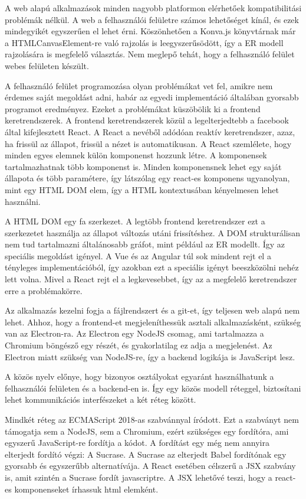 \documentclass[a4paper,12pt,oneside]{report}
\begin{document}
\begin{justify}

	A web alapú alkalmazások minden nagyobb platformon elérhetőek kompatibilitási problémák nélkül. A web a felhasználói felületre számos lehetőséget kínál, és ezek mindegyikét egyszerűen el lehet érni. Köszönhetően a Konva.js könyvtárnak már a HTMLCanvasElement-re való rajzolás is leegyszerűsödött, így a ER modell rajzolására is megfelelő választás. Nem meglepő tehát, hogy a felhasználó felület webes felületen készült. 

	A felhasználó felület programozása olyan problémákat vet fel, amikre nem érdemes saját megoldást adni, habár az egyedi implementáció általában gyorsabb programot eredményez. Ezeket a problémákat küszöbölik ki a frontend keretrendszerek. A frontend keretrendszerek közül a legelterjedtebb a facebook által kifejlesztett React. A React a nevéből adódóan reaktív keretrendszer, azaz, ha frissül az állapot, frissül a nézet is automatikusan. A React szemlélete, hogy minden egyes elemnek külön komponenst hozzunk létre. A komponensek tartalmazhatnak több komponenst is. Minden komponensnek lehet egy saját állapota és több paramétere, így látszólag egy react-es komponens ugyanolyan, mint egy HTML DOM elem, így a HTML kontextusában kényelmesen lehet használni.

	A HTML DOM egy fa szerkezet. A legtöbb frontend keretrendszer ezt a szerkezetet használja az állapot változás utáni frissítéshez. A DOM strukturálisan nem tud tartalmazni általánosabb gráfot, mint például az ER modellt. Így az speciális megoldást igényel. A Vue és az Angular túl sok mindent rejt el a tényleges implementációból, így azokban ezt a speciális igényt beeszközölni nehéz lett volna. Mivel a React rejt el a legkevesebbet, így az a megfelelő keretrendszer erre a problémakörre.

	Az alkalmazás kezelni fogja a fájlrendszert és a git-et, így teljesen web alapú nem lehet. Ahhoz, hogy a frontend-et megjeleníthessük asztali alkalmazásként, szükség van az Electron-ra. Az Electron egy NodeJS csomag, ami tartalmazza a Chromium böngésző egy részét, és gyakorlatilag ez adja a megjelenést. Az Electron miatt szükség van NodeJS-re, így a backend logikája is JavaScript lesz.

	A közös nyelv előnye, hogy bizonyos osztályokat egyaránt használhatunk a felhasználói felületen és a backend-en is. Így egy közös modell réteggel, biztosítani lehet kommunikációs interfészeket a két réteg között. 

	Mindkét réteg az ECMAScript 2018-as szabvánnyal íródott. Ezt a szabványt nem támogatja sem a NodeJS, sem a Chromium, ezért szükséges egy fordítóra, ami egyszerű JavaScript-re fordítja a kódot. A fordítást egy még nem annyira elterjedt fordító végzi: A Sucrase. A Sucrase az elterjedt Babel fordítónak egy gyorsabb és egyszerűbb alternatívája. A React esetében célszerű a JSX szabvány is, amit szintén a Sucrase fordít javascriptre. A JSX lehetővé teszi, hogy a react-es komponenseket írhassuk html elemként.


\end{justify}
\newpage
\end{document}

